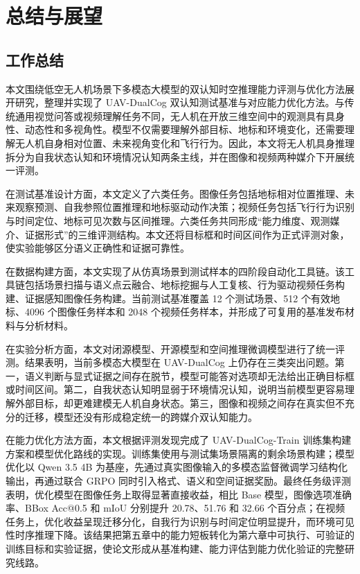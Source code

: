 
\chapter{总结与展望}

\section{工作总结}

本文围绕低空无人机场景下多模态大模型的双认知时空推理能力评测与优化方法展开研究，整理并实现了 UAV-DualCog 双认知测试基准与对应能力优化方法。与传统通用视觉问答或视频理解任务不同，无人机在开放三维空间中的观测具有具身性、动态性和多视角性。模型不仅需要理解外部目标、地标和环境变化，还需要理解无人机自身相对位置、未来视角变化和飞行行为。因此，本文将无人机具身推理拆分为自我状态认知和环境情况认知两条主线，并在图像和视频两种媒介下开展统一评测。

在测试基准设计方面，本文定义了六类任务。图像任务包括地标相对位置推理、未来观察预测、自我参照位置推理和地标驱动动作决策；视频任务包括飞行行为识别与时间定位、地标可见次数与区间推理。六类任务共同形成“能力维度、观测媒介、证据形式”的三维评测结构。本文还将目标框和时间区间作为正式评测对象，使实验能够区分语义正确性和证据可靠性。

在数据构建方面，本文实现了从仿真场景到测试样本的四阶段自动化工具链。该工具链包括场景扫描与语义点云融合、地标挖掘与人工复核、行为驱动视频任务构建、证据感知图像任务构建。当前测试基准覆盖 12 个测试场景、512 个有效地标、4096 个图像任务样本和 2048 个视频任务样本，并形成了可复用的基准发布材料与分析材料。

在实验分析方面，本文对闭源模型、开源模型和空间推理微调模型进行了统一评测。结果表明，当前多模态大模型在 UAV-DualCog 上仍存在三类突出问题。第一，语义判断与显式证据之间存在脱节，模型可能答对选项却无法给出正确目标框或时间区间。第二，自我状态认知明显弱于环境情况认知，说明当前模型更容易理解外部目标，却更难建模无人机自身状态。第三，图像和视频之间存在真实但不充分的迁移，模型还没有形成稳定统一的跨媒介双认知能力。

在能力优化方法方面，本文根据评测发现完成了 UAV-DualCog-Train 训练集构建方案和模型优化路线的实现。训练集使用与测试集场景隔离的剩余场景构建；模型优化以 Qwen 3.5 4B 为基座，先通过真实图像输入的多模态监督微调学习结构化输出，再通过联合 GRPO 同时引入格式、语义和空间证据奖励。最终任务级评测表明，优化模型在图像任务上取得显著直接收益，相比 Base 模型，图像选项准确率、BBox Acc@0.5 和 mIoU 分别提升 20.78、51.76 和 32.66 个百分点；在视频任务上，优化收益呈现迁移分化，自我行为识别与时间定位明显提升，而环境可见性时序推理下降。该结果把第五章中的能力短板转化为第六章中可执行、可验证的训练目标和实验证据，使论文形成从基准构建、能力评估到能力优化验证的完整研究线路。

